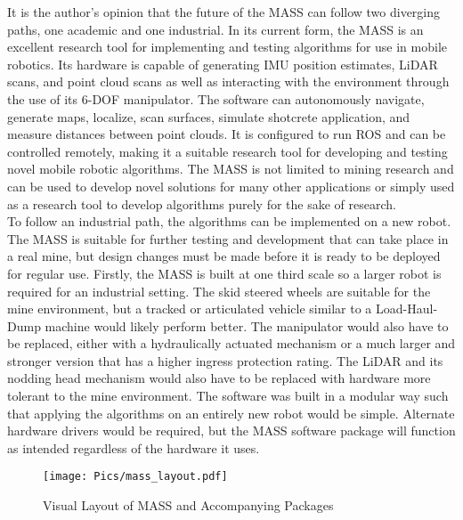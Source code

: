 It is the author's opinion that the future of the MASS can follow two diverging paths, one academic and one industrial. In its current form, the MASS is an excellent research tool for implementing and testing algorithms for use in mobile robotics. Its hardware is capable of generating IMU position estimates, LiDAR scans, and point cloud scans as well as interacting with the environment through the use of its 6-DOF manipulator. The software can autonomously navigate, generate maps, localize, scan surfaces, simulate shotcrete application, and measure distances between point clouds. It is configured to run ROS and can be controlled remotely, making it a suitable research tool for developing and testing novel mobile robotic algorithms. The MASS is not limited to mining research and can be used to develop novel solutions for many other applications or simply used as a research tool to develop algorithms purely for the sake of research.\\

To follow an industrial path, the algorithms can be implemented on a new robot. The MASS is suitable for further testing and development that can take place in a real mine, but design changes must be made before it is ready to be deployed for regular use. Firstly, the MASS is built at one third scale so a larger robot is required for an industrial setting. The skid steered wheels are suitable for the mine environment, but a tracked or articulated vehicle similar to a Load-Haul-Dump machine would likely perform better. The manipulator would also have to be replaced, either with a hydraulically actuated mechanism or a much larger and stronger version that has a higher ingress protection rating. The LiDAR and its nodding head mechanism would also have to be replaced with hardware more tolerant to the mine environment. The software was built in a modular way such that applying the algorithms on an entirely new robot would be simple. Alternate hardware drivers would be required, but the MASS software package will function as intended regardless of the hardware it uses.\\

\begin{figure}
    \centering
\texttt{[image: Pics/mass\_layout.pdf]} 
    \caption{Visual Layout of MASS and Accompanying Packages}
    \label{fig:masslay}
\end{figure}

